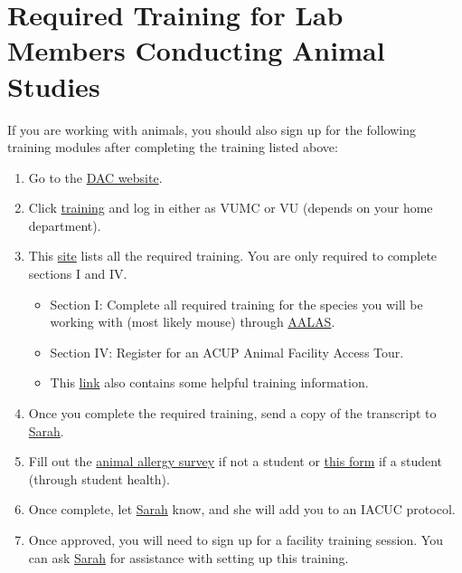\documentclass[
]{book}
\begin{document}
\hypertarget{required-training-for-lab-members-conducting-animal-studies}{%
\section{Required Training for Lab Members Conducting Animal Studies}\label{required-training-for-lab-members-conducting-animal-studies}}

If you are working with animals, you should also sign up for the following training modules after completing the training listed above:

\begin{enumerate}
\def\labelenumi{\arabic{enumi}.}
\item
  Go to the \href{https://www.vumc.org/acup/}{DAC website}.
\item
  Click \href{https://www.vumc.org/acup/iacuc/training}{training} and log in either as VUMC or VU (depends on your home department).
\item
  This \href{https://www.vumc.org/acup/acup-iacuc-required-course-information}{site} lists all the required training. You are only required to complete sections I and IV.

  \begin{itemize}
  \item
    Section I: Complete all required training for the species you will be working with (most likely mouse) through \href{https://sso.aalaslearninglibrary.org/Shibboleth.sso/Login?entityID=https://sso.service.vumc.org}{AALAS}.
  \item
    Section IV: Register for an ACUP Animal Facility Access Tour.
  \item
    This \href{https://www.vumc.org/acup/acup-iacuc-recommended-courses}{link} also contains some helpful training information.
  \end{itemize}
\item
  Once you complete the required training, send a copy of the transcript to \href{mailto:sarah.m.sturgeon@Vanderbilt.Edu}{Sarah}.
\item
  Fill out the \href{https://www.vumc.org/health-wellness/news-resource-articles/animal-allergy-questionnaire}{animal allergy survey} if not a student or \href{https://www.vumc.org/student-health/sites/default/files/Animal\%20Allergy\%20Questionnaire\%20and\%20IACUC\%20Occ.\%20Health\%20Form.pdf}{this form} if a student (through student health).
\item
  Once complete, let \href{mailto:sarah.m.sturgeon@Vanderbilt.Edu}{Sarah} know, and she will add you to an IACUC protocol.
\item
  Once approved, you will need to sign up for a facility training session. You can ask \href{mailto:sarah.m.sturgeon@Vanderbilt.Edu}{Sarah} for assistance with setting up this training.
\end{enumerate}
\end{document}
